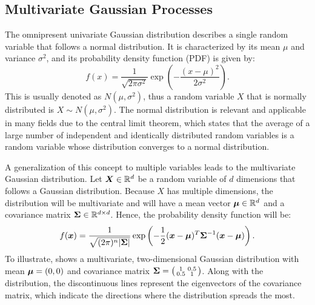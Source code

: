 \subsection{Multivariate Gaussian Processes}

The omnipresent univariate Gaussian distribution describes a single random variable that follows a normal distribution. It is characterized by its mean $\mu$ and variance $\sigma^2$, and its probability density function (PDF) is given by:
\begin{equation*}
    f(x) = \frac{1}{\sqrt{2\pi\sigma^2}} \exp\left(-\frac{(x - \mu)^2}{2\sigma^2}\right).
\end{equation*}
This is usually denoted as $N(\mu, \sigma^2)$, thus a random variable $X$ that is normally distributed is $X\sim N(\mu, \sigma^2)$. The normal distribution is relevant and applicable in many fields due to the central limit theorem, which states that the average of a large number of independent and identically distributed random variables is a random variable whose distribution converges to a normal distribution.

A generalization of this concept to multiple variables leads to the multivariate Gaussian distribution. Let $\boldsymbol{X} \in \mathbb{R}^d$ be a random variable of $d$ dimensions that follows a Gaussian distribution. Because $X$ has multiple dimensions, the distribution will be multivariate and will have a mean vector $\boldsymbol{\mu}\in\mathbb{R}^d$ and a covariance matrix $\boldsymbol{\Sigma}\in\mathbb{R}^{d\times d}$. Hence, the probability density function will be:
\begin{equation}
    f(\boldsymbol{x}) = \frac{1}{\sqrt{(2\pi)^n |\boldsymbol{\Sigma}|}} \exp\left(-\frac{1}{2}(\boldsymbol{x} - \boldsymbol{\mu})^T \boldsymbol{\Sigma}^{-1} (\boldsymbol{x} - \boldsymbol{\mu})\right).
    \label{eq:gaussian_dist}
\end{equation}
To illustrate,  shows a multivariate, two-dimensional Gaussian distribution with mean $\boldsymbol{\mu} = (0,0)$ and covariance matrix $\boldsymbol{\Sigma} = \bigl( \begin{smallmatrix}1 & 0.5\\ 0.5 & 1\end{smallmatrix}\bigr)$. Along with the distribution, the discontinuous lines represent the eigenvectors of the covariance matrix, which indicate the directions where the distribution spreads the most.


